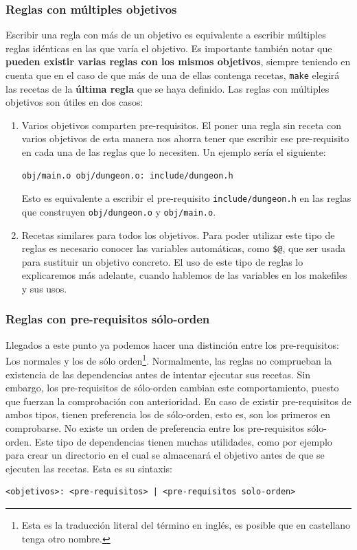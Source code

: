 \documentclass[11pt,twoside,titlepage,a4paper]{article}
\theoremstyle{definition}
\theoremstyle{plain_rojo}
\theoremstyle{remark}
\begin{document}
\subsubsection{Reglas con múltiples objetivos}

Escribir una regla con más de un objetivo es equivalente a escribir múltiples 
reglas idénticas en las que varía el objetivo. Es importante también notar 
que \textbf{pueden existir varias reglas con los mismos objetivos}, siempre 
teniendo en cuenta que en el caso de que más de una de ellas contenga 
recetas, \texttt{make} elegirá las recetas de la \textbf{última regla} que se 
haya definido. Las reglas con múltiples objetivos son útiles en dos casos:

\begin{enumerate}[font={\color{rojooscuro}\bfseries}]
	\item Varios objetivos comparten pre-requisitos. El poner una regla sin
	receta con varios objetivos de esta manera nos ahorra tener que escribir 
	ese pre-requisito en cada una de las reglas que lo necesiten. Un ejemplo
	sería el siguiente:
\begin{lstlisting}
obj/main.o obj/dungeon.o: include/dungeon.h
\end{lstlisting}
	Esto es equivalente a escribir el pre-requisito \texttt{include/dungeon.h}
	en las reglas que construyen \texttt{obj/dungeon.o} y \texttt{obj/main.o}.
	\item Recetas similares para todos los objetivos. Para poder utilizar
	este tipo de reglas es necesario conocer las variables automáticas, como
	\texttt{\$@}, que ser usada para sustituir un objetivo concreto. El uso 
	de este tipo de reglas lo explicaremos más adelante, cuando hablemos de 
	las variables en los makefiles y sus usos.
\end{enumerate}

\subsubsection{Reglas con pre-requisitos sólo-orden}

Llegados a este punto ya podemos hacer una distinción entre los 
pre-requisitos: Los normales y los de sólo orden\footnote{Esta es la 
traducción literal del término en inglés, es posible que en castellano tenga 
otro nombre.}. Normalmente, las reglas no comprueban la existencia de las 
dependencias antes de intentar ejecutar sus recetas. Sin embargo, los 
pre-requisitos de sólo-orden cambian este comportamiento, puesto que fuerzan 
la comprobación con anterioridad. En caso de existir pre-requisitos de ambos 
tipos, tienen preferencia los de sólo-orden, esto es, son los primeros en 
comprobarse. No existe un orden de preferencia entre los pre-requisitos 
sólo-orden. Este tipo de dependencias tienen muchas utilidades, como por 
ejemplo para crear un directorio en el cual se almacenará el objetivo antes 
de que se ejecuten las recetas. Esta es su sintaxis:
\bigskip
\begin{lstlisting}
<objetivos>: <pre-requisitos> | <pre-requisitos solo-orden>
\end{lstlisting}
\end{document}
